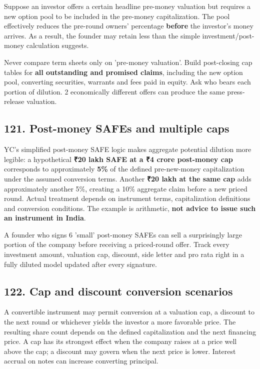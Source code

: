 Suppose an investor offers a certain headline pre-money valuation but requires a new option pool to be included in the pre-money capitalization. The pool effectively reduces the pre-round owners' percentage \textbf{before} the investor's money arrives. As a result, the founder may retain less than the simple investment/post-money calculation suggests.

Never compare term sheets only on 'pre-money valuation'. Build post-closing cap tables for \textbf{all outstanding and promised claims}, including the new option pool, converting securities, warrants and fees paid in equity. Ask who bears each portion of dilution. 2 economically different offers can produce the same press-release valuation.

\subsection{121. Post-money SAFEs and multiple caps}


YC's simplified post-money SAFE logic makes aggregate potential dilution more legible: a hypothetical \textbf{₹20 lakh SAFE at a ₹4 crore post-money cap} corresponds to approximately \textbf{5\%} of the defined pre-new-money capitalization under the assumed conversion terms. Another \textbf{₹20 lakh at the same cap} adds approximately another 5\%, creating a 10\% aggregate claim before a new priced round. Actual treatment depends on instrument terms, capitalization definitions and conversion conditions. The example is arithmetic, \textbf{not advice to issue such an instrument in India}.

A founder who signs 6 'small' post-money SAFEs can sell a surprisingly large portion of the company before receiving a priced-round offer. Track every investment amount, valuation cap, discount, side letter and pro rata right in a fully diluted model updated after every signature.

\subsection{122. Cap and discount conversion scenarios}


A convertible instrument may permit conversion at a valuation cap, a discount to the next round or whichever yields the investor a more favorable price. The resulting share count depends on the defined capitalization and the next financing price. A cap has its strongest effect when the company raises at a price well above the cap; a discount may govern when the next price is lower. Interest accrual on notes can increase converting principal.

